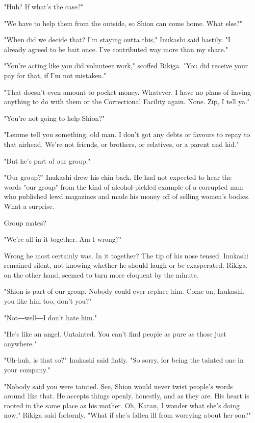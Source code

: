 "Huh? If what's the case?"

"We have to help them from the outside, so Shion can come home. What
else?"

"When did we decide that? I'm staying outta this," Inukashi said
hastily. "I already agreed to be bait once. I've contributed way more
than my share."

"You're acting like you did volunteer work," scoffed Rikiga. "You did
receive your pay for that, if I'm not mistaken."

"That doesn't even amount to pocket money. Whatever. I have no plans of
having anything to do with them or the Correctional Facility again.
None. Zip, I tell ya."

"You're not going to help Shion?"

"Lemme tell you something, old man. I don't got any debts or favours to
repay to that airhead. We're not friends, or brothers, or relatives, or
a parent and kid."

"But he's part of our group."

"Our group?" Inukashi drew his chin back. He had not expected to hear
the words "our group" from the kind of alcohol-pickled example of a
corrupted man who published lewd magazines and made his money off of
selling women's bodies. What a surprise.

Group mates?

"We're all in it together. Am I wrong?"

Wrong he most certainly was. In it together? The tip of his nose tensed.
Inukashi remained silent, not knowing whether he should laugh or be
exasperated. Rikiga, on the other hand, seemed to turn more eloquent by
the minute.

"Shion is part of our group. Nobody could ever replace him. Come on,
Inukashi, you like him too, don't you?"

"Not―well―I don't hate him."

"He's like an angel. Untainted. You can't find people as pure as those
just anywhere."

"Uh-huh, is that so?" Inukashi said flatly. "So sorry, for being the
tainted one in your company."

"Nobody said you were tainted. See, Shion would never twist people's
words around like that. He accepts things openly, honestly, and as they
are. His heart is rooted in the same place as his mother. Oh, Karan, I
wonder what she's doing now," Rikiga said forlornly. "What if she's
fallen ill from worrying about her son?"

